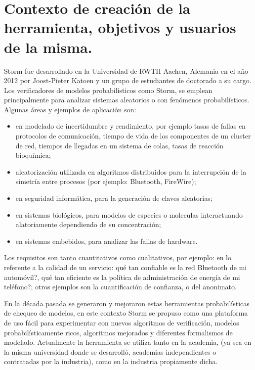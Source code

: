 \documentclass[11pt]{article}
\begin{document}
\section{Contexto de creaci\'on de la herramienta, objetivos y usuarios de la misma.} 

Storm fue desarrollado en la Universidad de RWTH Aachen, Alemania en el a\~no 2012 por Joost-Pieter Katoen y un grupo de estudiantes de doctorado a su cargo. Los verificadores de modelos probabil\'isticos como Storm, se emplean principalmente para analizar sistemas aleatorios o con fen\'omenos probabil\'isticos. Algunas \'areas y ejemplos de aplicaci\'on son: 

\begin{itemize}
	\item en modelado de incertidumbre y rendimiento, por ejemplo tasas de fallas en protocolos de comunicaci\'on, tiempo de vida de los componentes de un cluster de red, tiempos de llegadas en un sistema de colas, tasas de reacci\'on bioqu\'imica;
	
	\item aleatorizaci\'on utilizada en algoritmos distribuidos para la interrupci\'on de la simetr\'ia entre procesos (por ejemplo: Bluetooth, FireWire);
	
	\item en seguridad inform\'atica, para la generaci\'on de claves aleatorias;
	
	\item en sistemas biol\'ogicos, para modelos de especies o moleculas interactuando alatoriamente dependiendo de su concentraci\'on;
	
	\item en sistemas embebidos, para analizar las fallas de hardware.
\end{itemize} 

Los requisitos son tanto cuantitativos como cualitativos, por ejemplo: en lo referente a la calidad de un servicio: \textquestiondown qu\'e tan confiable es la red Bluetooth de mi autom\'ovil?, \textquestiondown qu\'e tan eficiente es la pol\'itica de administraci\'on de energ\'ia de mi tel\'efono?; otros ejemplos son la cuantificaci\'on de confianza, o del anonimato.

En la d\'ecada pasada se generaron y mejoraron estas herramientas probabil\'isticas de chequeo de modelos, en este contexto Storm se propuso como una plataforma de uso f\'acil para experimentar con nuevos algoritmos de verificaci\'on, modelos probabil\'isticamente ricos, algoritmos mejorados y diferentes formalismos de modelado. Actualmente la herramienta se utiliza tanto en la academia, (ya sea en la misma universidad donde se desarroll\'o, academias independientes o contratadas por la industria), como en la industria propiamente dicha.
\end{document}
